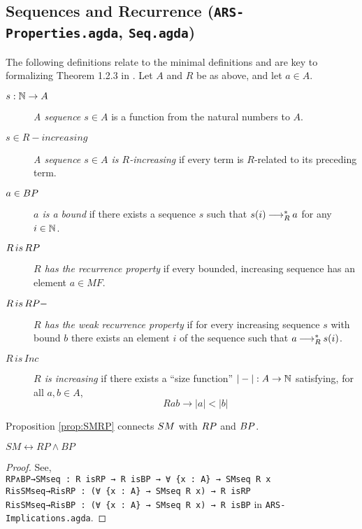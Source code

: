 \subsection{Sequences and Recurrence (\texttt{ARS-Properties.agda}, \texttt{Seq.agda})}
\begin{definition} The following definitions relate to the minimal definitions and are key to formalizing Theorem 1.2.3 in \terese. Let $A$ and $R$ be as above, and let $a \in A$.
    \begin{description}
        \item[$s : \mathbb{N} \to A$] \emph{A sequence $s \in A$} is a function from the natural numbers to $A$.  
        \item[$s \in R-increasing$] \emph{A sequence $s \in A$ is $R$-increasing} if every term is $R$-related to its preceding term.
        \item[$a \in \BP$] \emph{$a$ is a bound} if there exists a sequence $s$ such that $s (i) \mathbin{\longrightarrow_R^*} a$ for any $i \in \mathbb{N}$. 
        \item[$R\, is\, \RP$] \emph{$R$ has the recurrence property} if every bounded, increasing sequence has an element $a \in MF$.
        \item[$R\, is\, \RPm$] \emph{$R$ has the weak recurrence property} if for every increasing sequence $s$ with bound $b$ there exists an element $i$ of the sequence such that $a \mathbin{\longrightarrow_R^*} s (i)$.
        \item[$R\, is\, Inc$] \emph{$R$ is increasing} if there exists a ``size function'' $|-| : A \to \mathbb{N}$ satisfying, for all $a, b \in A$,
        \[ Rab \to |a| < |b| \]       
    \end{description}
\end{definition}
Proposition \ref{prop:SMRP} connects $\SM$ with $\RP$ and $\BP$.
\begin{proposition}\label{prop:SMRP}
    $SM \leftrightarrow RP \land BP$
\end{proposition}
\begin{proof}
    See,\\ \verb|RP∧BP→SMseq : R isRP → R isBP → ∀ {x : A} → SMseq R x| \\ \verb|RisSMseq→RisRP : (∀ {x : A} → SMseq R x) → R isRP|
    \\ \verb|RisSMseq→RisBP : (∀ {x : A} → SMseq R x) → R isBP| in \texttt{ARS-Implications.agda}.
\end{proof}

